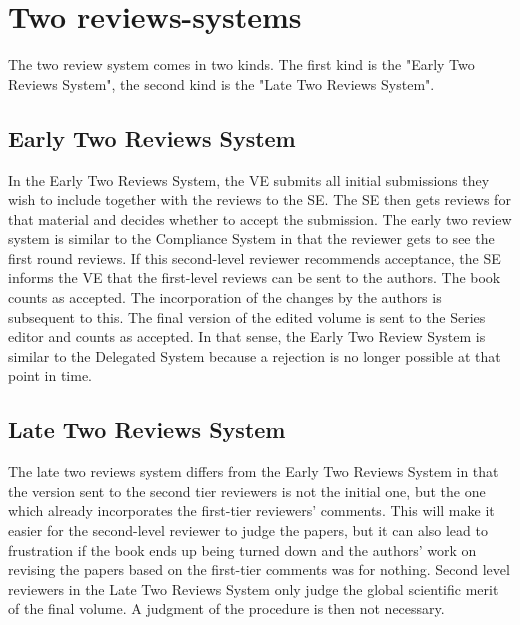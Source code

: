 \documentclass[border=20pt]{article}
\begin{document}
\section*{Two reviews-systems}
The two review system comes in two kinds. The first kind is the "Early Two Reviews System", the second kind is the "Late Two Reviews System".

\subsection*{Early Two Reviews System}
 In the Early Two Reviews System, the VE submits all initial submissions they wish to include together with the reviews to the SE. The SE then gets reviews for that material and decides whether to accept the submission. The early two review system is similar to the Compliance System in that the reviewer gets to see the first round reviews. If this second-level reviewer recommends acceptance, the SE informs the VE that the first-level reviews can be sent to the authors. The book counts as accepted. The incorporation of the changes by the authors is subsequent to this. The final version of the edited volume is sent to the Series editor and counts as accepted. In that sense, the Early Two Review System is similar to the Delegated System because a rejection is no longer possible at that point in time. 


\subsection*{Late Two Reviews System}
The late two reviews system differs from the Early Two Reviews System in that the version sent to the second tier reviewers is not the initial one, but the one which already incorporates the first-tier reviewers' comments. This will make it easier for the second-level reviewer to judge the papers, but it can also lead to frustration if the book ends up being turned down and the authors' work on revising the papers based on the first-tier comments was for nothing. Second level reviewers in the Late Two Reviews System only judge the global scientific merit of the final volume. A judgment of the procedure is then not necessary.
\end{document}

